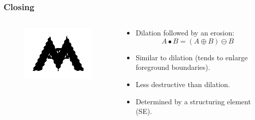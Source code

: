 \begin{frame}
\frametitle{Closing}
\begin{columns}
\begin{column}{.3\textwidth}
\begin{figure}
\centering
\includegraphics[width=\textwidth]{closeb.png}
\end{figure}
\end{column}
\begin{column}{.7\textwidth}
\begin{itemize}
\item Dilation followed by an erosion:
\[A \bullet B = \left ( A \oplus B \right ) \ominus B\]
\item Similar to dilation (tends to enlarge foreground boundaries).
\item Less destructive than dilation.
\item Determined by a structuring element (SE).
\end{itemize}
\end{column}
\end{columns}
\end{frame}

